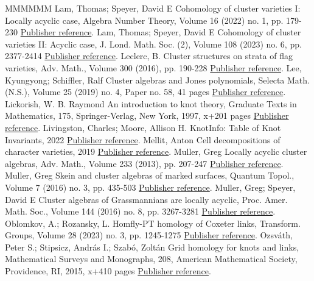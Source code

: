 \begin{thebibliography}{MMMMMM}
 Lam, Thomas; Speyer, David E Cohomology of cluster varieties I: Locally acyclic case, Algebra Number Theory, Volume 16 (2022) no. 1, pp. 179-230 \href{https://alco.centre-mersenne.org/articles/10.5802/alco.345/#LS}{Publisher reference}.
 Lam, Thomas; Speyer, David E Cohomology of cluster varieties II: Acyclic case, J. Lond. Math. Soc. (2), Volume 108 (2023) no. 6, pp. 2377-2414 \href{https://alco.centre-mersenne.org/articles/10.5802/alco.345/#LS2}{Publisher reference}.
 Leclerc, B. Cluster structures on strata of flag varieties, Adv. Math., Volume 300 (2016), pp. 190-228 \href{https://alco.centre-mersenne.org/articles/10.5802/alco.345/#Lec}{Publisher reference}.
 Lee, Kyungyong; Schiffler, Ralf Cluster algebras and Jones polynomials, Selecta Math. (N.S.), Volume 25 (2019) no. 4, Paper no. 58, 41 pages \href{https://alco.centre-mersenne.org/articles/10.5802/alco.345/#LeeSch}{Publisher reference}.
 Lickorish, W. B. Raymond An introduction to knot theory, Graduate Texts in Mathematics, 175, Springer-Verlag, New York, 1997, x+201 pages \href{https://alco.centre-mersenne.org/articles/10.5802/alco.345/#Lickorish}{Publisher reference}.
 Livingston, Charles; Moore, Allison H. KnotInfo: Table of Knot Invariants, 2022 \href{https://alco.centre-mersenne.org/articles/10.5802/alco.345/#knotinfo}{Publisher reference}.
 Mellit, Anton Cell decompositions of character varieties, 2019 \href{https://alco.centre-mersenne.org/articles/10.5802/alco.345/#Mellit_Cell}{Publisher reference}.
 Muller, Greg Locally acyclic cluster algebras, Adv. Math., Volume 233 (2013), pp. 207-247 \href{https://alco.centre-mersenne.org/articles/10.5802/alco.345/#Muller}{Publisher reference}.
 Muller, Greg Skein and cluster algebras of marked surfaces, Quantum Topol., Volume 7 (2016) no. 3, pp. 435-503 \href{https://alco.centre-mersenne.org/articles/10.5802/alco.345/#Muller_skein}{Publisher reference}.
 Muller, Greg; Speyer, David E Cluster algebras of Grassmannians are locally acyclic, Proc. Amer. Math. Soc., Volume 144 (2016) no. 8, pp. 3267-3281 \href{https://alco.centre-mersenne.org/articles/10.5802/alco.345/#MSLA}{Publisher reference}.
 Oblomkov, A.; Rozansky, L. Homfly-PT homology of Coxeter links, Transform. Groups, Volume 28 (2023) no. 3, pp. 1245-1275 \href{https://alco.centre-mersenne.org/articles/10.5802/alco.345/#ObRo}{Publisher reference}.
 Ozsváth, Peter S.; Stipsicz, András I.; Szabó, Zoltán Grid homology for knots and links, Mathematical Surveys and Monographs, 208, American Mathematical Society, Providence, RI, 2015, x+410 pages \href{https://alco.centre-mersenne.org/articles/10.5802/alco.345/#OSS}{Publisher reference}.

\end{thebibliography}
